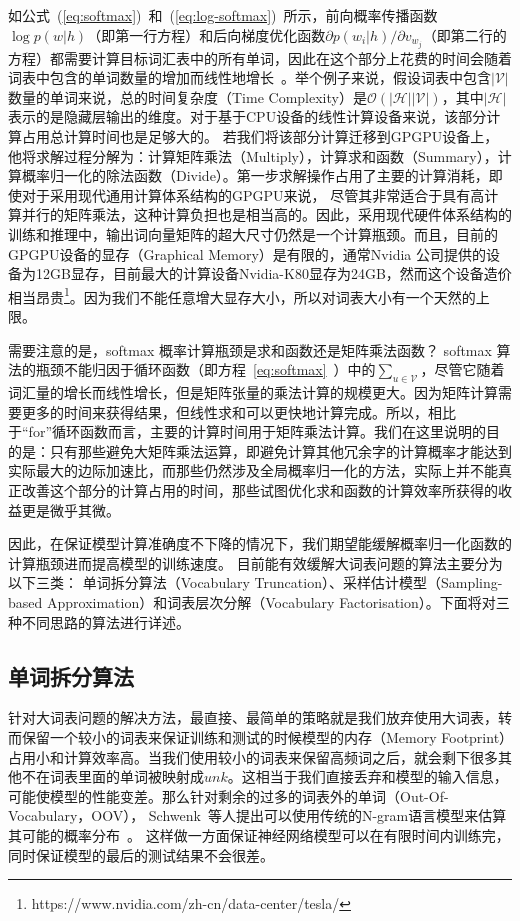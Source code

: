 如公式~(\ref{eq:softmax})~和~(\ref{eq:log-softmax})~所示，前向概率传播函数$\log p(w|h) $（即第一行方程）和后向梯度优化函数${\partial p(w_i|h)}/{\partial v_{w_j}}$（即第二行的方程）都需要计算目标词汇表中的所有单词，因此在这个部分上花费的时间会随着词表中包含的单词数量的增加而线性地增长~。举个例子来说，假设词表中包含$ \mathcal{| V |} $ 数量的单词来说，总的时间复杂度（Time Complexity）是$\mathcal{O}(\mathcal{|H ||V|})$，其中$\mathcal{|H|}$表示的是隐藏层输出的维度。对于基于CPU设备的线性计算设备来说，该部分计算占用总计算时间也是足够大的。
若我们将该部分计算迁移到GPGPU设备上，他将求解过程分解为：计算矩阵乘法（Multiply），计算求和函数（Summary），计算概率归一化的除法函数（Divide）。第一步求解操作占用了主要的计算消耗，即使对于采用现代通用计算体系结构的GPGPU来说， 尽管其非常适合于具有高计算并行的矩阵乘法，这种计算负担也是相当高的。因此，采用现代硬件体系结构的训练和推理中，输出词向量矩阵的超大尺寸仍然是一个计算瓶颈。而且，目前的GPGPU设备的显存（Graphical Memory）是有限的，通常Nvidia 公司提供的设备为12GB显存，目前最大的计算设备Nvidia-K80显存为24GB，然而这个设备造价相当昂贵\footnote{https://www.nvidia.com/zh-cn/data-center/tesla/}。因为我们不能任意增大显存大小，所以对词表大小有一个天然的上限。

需要注意的是，softmax 概率计算瓶颈是求和函数还是矩阵乘法函数？ softmax 算法的瓶颈不能归因于循环函数（即方程~\ref{eq:softmax}~）中的$ \sum_ {u \in \mathcal {V}} $，尽管它随着词汇量的增长而线性增长，但是矩阵张量的乘法计算的规模更大。因为矩阵计算需要更多的时间来获得结果，但线性求和可以更快地计算完成。所以，相比于``for''循环函数而言，主要的计算时间用于矩阵乘法计算。我们在这里说明的目的是：只有那些避免大矩阵乘法运算，即避免计算其他冗余字的计算概率才能达到实际最大的边际加速比，而那些仍然涉及全局概率归一化的方法，实际上并不能真正改善这个部分的计算占用的时间，那些试图优化求和函数的计算效率所获得的收益更是微乎其微。



因此，在保证模型计算准确度不下降的情况下，我们期望能缓解概率归一化函数的计算瓶颈进而提高模型的训练速度。 目前能有效缓解大词表问题的算法主要分为以下三类： 单词拆分算法（Vocabulary Truncation）、采样估计模型（Sampling-based Approximation）和词表层次分解（Vocabulary Factorisation）。下面将对三种不同思路的算法进行详述。


\subsection{单词拆分算法}
针对大词表问题的解决方法，最直接、最简单的策略就是我们放弃使用大词表，转而保留一个较小的词表来保证训练和测试的时候模型的内存（Memory Footprint）占用小和计算效率高。当我们使用较小的词表来保留高频词之后，就会剩下很多其他不在词表里面的单词被映射成$unk$。这相当于我们直接丢弃和模型的输入信息，可能使模型的性能变差。那么针对剩余的过多的词表外的单词（Out-Of-Vocabulary，OOV）， Schwenk~等人提出可以使用传统的N-gram语言模型来估算其可能的概率分布~。
这样做一方面保证神经网络模型可以在有限时间内训练完，同时保证模型的最后的测试结果不会很差。

